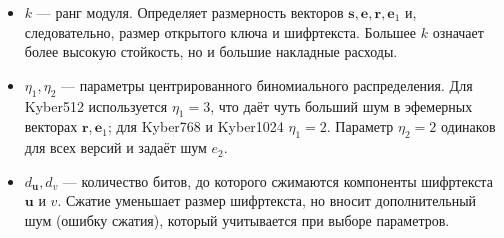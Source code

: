 \documentclass[11pt,a4paper]{article}
\begin{document}
\begin{itemize}
    \item \textbf{\(k\)} — ранг модуля. Определяет размерность векторов \(\mathbf{s}, \mathbf{e}, \mathbf{r}, \mathbf{e}_1\) и, следовательно, размер открытого ключа и шифртекста. Большее \(k\) означает более высокую стойкость, но и большие накладные расходы.
    \item \textbf{\(\eta_1, \eta_2\)} — параметры центрированного биномиального распределения. Для Kyber512 используется \(\eta_1=3\), что даёт чуть больший шум в эфемерных векторах \(\mathbf{r}, \mathbf{e}_1\); для Kyber768 и Kyber1024 \(\eta_1=2\). Параметр \(\eta_2=2\) одинаков для всех версий и задаёт шум \(e_2\).
    \item \textbf{\(d_{\mathbf{u}}, d_v\)} — количество битов, до которого сжимаются компоненты шифртекста \(\mathbf{u}\) и \(v\). Сжатие уменьшает размер шифртекста, но вносит дополнительный шум (ошибку сжатия), который учитывается при выборе параметров.
\end{itemize}




\end{document}
